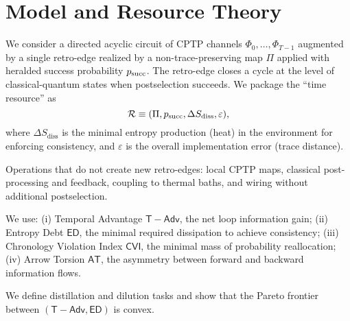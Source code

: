 
\section{Model and Resource Theory}
We consider a directed acyclic circuit of CPTP channels $\Phi_0,\ldots,\Phi_{T-1}$ augmented by a single retro-edge realized by a non-trace-preserving map $\Pi$ applied with heralded success probability $p_{\mathrm{succ}}$. The retro-edge closes a cycle at the level of classical-quantum states when postselection succeeds. We package the ``time resource'' as
\[
\mathcal{R} \equiv (\Pi, p_{\mathrm{succ}}, \Delta S_{\mathrm{diss}}, \varepsilon),
\]
where $\Delta S_{\mathrm{diss}}$ is the minimal entropy production (heat) in the environment for enforcing consistency, and $\varepsilon$ is the overall implementation error (trace distance).

\begin{definition}
Operations that do not create new retro-edges: local CPTP maps, classical post-processing and feedback, coupling to thermal baths, and wiring without additional postselection.
\end{definition}

\begin{definition}[Monotones]
We use: (i) Temporal Advantage $\mathsf{T\!-\!Adv}$, the net loop information gain; (ii) Entropy Debt $\mathsf{ED}$, the minimal required dissipation to achieve consistency; (iii) Chronology Violation Index $\mathsf{CVI}$, the minimal mass of probability reallocation; (iv) Arrow Torsion $\mathsf{AT}$, the asymmetry between forward and backward information flows.
\end{definition}

We define distillation and dilution tasks and show that the Pareto frontier between $(\mathsf{T\!-\!Adv},\mathsf{ED})$ is convex.
